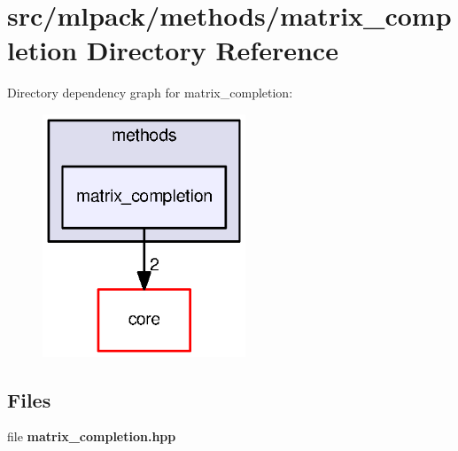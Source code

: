 \section{src/mlpack/methods/matrix\+\_\+completion Directory Reference}
\label{dir_132206e4f3eb299a76e39a3cdd5fd682}
Directory dependency graph for matrix\+\_\+completion\+:
\nopagebreak
\begin{figure}[H]
\begin{center}
\leavevmode
\includegraphics[width=172pt]{dir_132206e4f3eb299a76e39a3cdd5fd682_dep}
\end{center}
\end{figure}
\subsection*{Files}
\begin{DoxyCompactItemize}
\item 
file {\bf matrix\+\_\+completion.\+hpp}
\end{DoxyCompactItemize}
